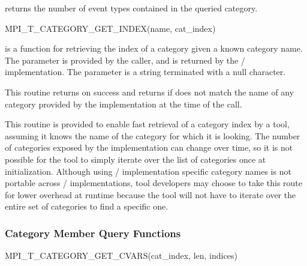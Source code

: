  returns the number of event types
contained in the queried category.

\begin{funcdef}{MPI\_T\_CATEGORY\_GET\_INDEX}{(\mbox{name}, \mbox{cat\_index})}
\end{funcdef}

 is a function for retrieving the index of a category given a known category name.
The  parameter is provided by the caller, and  is returned by the \MPI/ implementation.
The  parameter is a string terminated with a null character.

This routine returns  on success and returns
 if  does not match the name
of any category provided by the implementation at the time of the call.

\begin{rationale}
This routine is provided to enable fast retrieval of a category index by a
tool, assuming it knows the name of the category for which it is looking.
The number of categories exposed by the implementation can change over
time, so it is not possible for the tool to simply iterate over the list of
categories once at initialization.  Although using \MPI/ implementation
specific category names is not portable across \MPI/ implementations, tool
developers may choose to take this route for lower overhead at runtime
because the tool will not have to iterate over the entire set of categories
to find a specific one.
\end{rationale}

\subsubsection{Category Member Query Functions}
\label{sec:mpit:category_query_functions}

\begin{funcdef}{MPI\_T\_CATEGORY\_GET\_CVARS}{(\mbox{cat\_index}, \mbox{len}, \mbox{indices})}
\end{funcdef}

